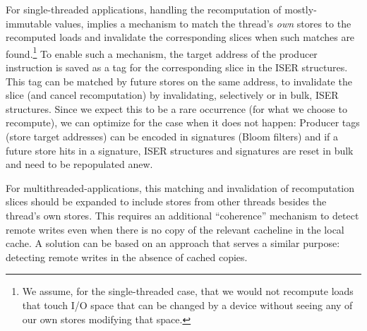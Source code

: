 For single-threaded applications,
handling the recomputation of mostly-immutable values, implies a mechanism to match the thread's \emph{own} stores to the recomputed loads and invalidate the corresponding {\recomp} slices when such matches are found.\footnote{We assume, for the single-threaded case, that we would not recompute loads that touch I/O space that can be changed by a device without seeing any of our own stores modifying that space.}
%
To enable such a mechanism, the target address of the producer instruction %
is saved as a tag for the corresponding slice in the ISER structures. This tag can be matched by future stores on the same address, to invalidate the slice (and cancel recomputation) by invalidating, selectively or in bulk, ISER structures.
Since we expect this to be a rare occurrence (for what we choose to recompute), we can optimize for the case when it does not happen: Producer tags (store target addresses) can be encoded in signatures (Bloom filters) and 
if a future store hits in a signature, ISER structures and signatures are reset in bulk and need to be repopulated anew.

For multithreaded-applications, this matching and invalidation of recomputation slices should be expanded to include stores from other threads besides the thread's own stores. This requires an additional ``coherence'' mechanism to detect remote writes even when there is no copy of the relevant cacheline in the local cache. %
A solution can be based on an approach that serves a similar purpose: detecting remote writes in the absence of cached copies.

